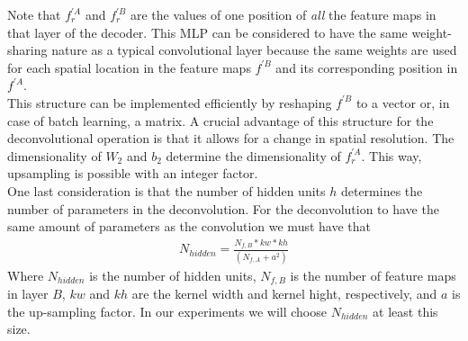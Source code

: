 Note that $f^{\prime A}_r$ and $f^{\prime B}_r$ are the values of one position of \textit{all} the feature maps in that layer of the decoder. This MLP can be considered to have the same weight-sharing nature as a typical convolutional layer because the same weights are used for each spatial location in the feature maps $f^{\prime B}$ and its corresponding position in $f^{\prime A}$.\\
This structure can be implemented efficiently by reshaping $f^{\prime B}$ to a vector or, in case of batch learning, a matrix. A crucial advantage of this structure for the deconvolutional operation is that it allows for a change in spatial resolution. The dimensionality of $W_2$ and $b_2$ determine the dimensionality of $f^{\prime A}_r$. This way, upsampling is possible with an integer factor. \\
One last consideration is that the number of hidden units $h$ determines the number of parameters in the deconvolution. For the deconvolution to have the same amount of parameters as the convolution we must have that
\begin{align}
N_{hidden} = \frac{N_{f,B} * kw * kh}{(N_{f,A} + a^2)}
\end{align}
Where $N_{hidden}$ is the number of hidden units, $N_{f,B}$ is the number of feature maps in layer $B$, $kw$ and $kh$ are the kernel width and kernel hight, respectively, and $a$ is the up-sampling factor. In our experiments we will choose $N_{hidden}$ at least this size.

